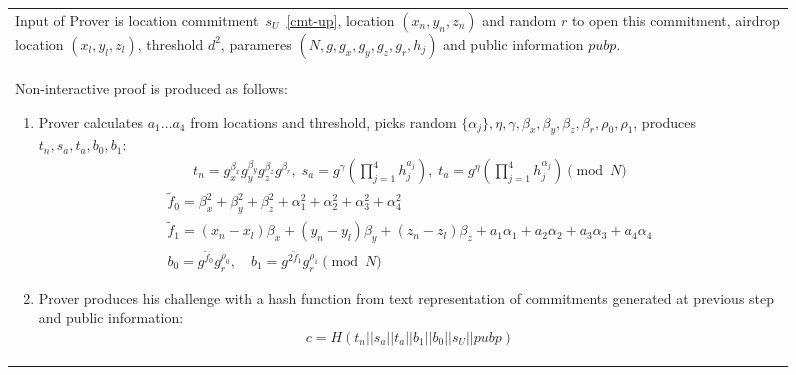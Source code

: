 \documentclass{article}
\begin{document}
\begin{figure}[!htb]
\begin{tabular}{|p{\linewidth}|}
\hline

Input of Prover is
  location commitment~$s_U$~\eqref{cmt-up},
  location $(x_n, y_n, z_n)$ and random $r$ to open this commitment,
  airdrop location $(x_l, y_l, z_l)$,
  threshold $d^2$,
  parameres $(N, g, g_x, g_y, g_z, g_r, h_j)$
  and public information $pubp$.
\\
Non-interactive proof is produced as follows:
\begin{enumerate}
\item
  Prover calculates $a_1 \dots a_4$ from locations and threshold,
  picks random $\{\alpha_j\}, \eta, \gamma, \beta_x, \beta_y, \beta_z, \beta_r, \rho_0, \rho_1$,
  produces $t_n, s_a, t_a, b_0, b_1$:
\begin{gather}
  t_n = g_x^{\beta_x} g_y^{\beta_y} g_z^{\beta_z} g^{\beta_r}, \;
  s_a = g^{\gamma} (\prod_{j=1}^4 h_j^{a_j}),  \;
  t_a = g^{\eta} (\prod_{j=1}^4 h_j^{\alpha_j}) \pmod{N}
\end{gather}
\begin{gather}
  \tilde f_0 = \beta_x^2 + \beta_y^2 +\beta_z^2 + \alpha_1^2 + \alpha_2^2 + \alpha_3^2 + \alpha_4^2  \\
  \tilde f_1 = (x_n - x_l) \beta_x  + (y_n - y_l) \beta_y  + (z_n - z_l) \beta_z + a_1 \alpha_1 + a_2 \alpha_2 + a_3 \alpha_3 + a_4 \alpha_4 \\
  b_0 = g^{\tilde f_0} g_r^{\rho_0},   \quad
  b_1 = g^{2 \tilde f_1} g_r^{\rho_1} \pmod{N}
\end{gather}

\item
  Prover produces his challenge with a hash function
  from text representation of commitments generated at previous step and public information:
\begin{gather}
  c = H(t_n || s_a || t_a || b_1 || b_0 || s_U || pubp)
\end{gather}


\end{enumerate}
\end{tabular}
\end{figure}
\end{document}
